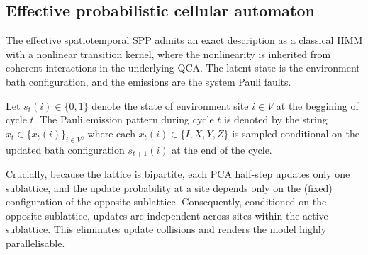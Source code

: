 \subsection{Effective probabilistic cellular automaton}\label{sec:pca-details}
The effective spatiotemporal SPP admits an exact description as a classical HMM with a nonlinear transition kernel, where the nonlinearity is inherited from coherent interactions in the underlying QCA. The latent state is the environment bath configuration, and the emissions are the system Pauli faults.

Let \(s_{t}(i) \in \{0,1\}\) denote the state of environment site \(i \in V\) at the beggining of cycle \(t\). The Pauli emission pattern during cycle \(t\) is denoted by the string \(x_t \in \{x_t(i)\}_{i \in V}\), where each \(x_t(i) \in \{I, X, Y, Z\}\) is sampled conditional on the updated bath configuration \(s_{t+1}(i)\) at the end of the cycle.

Crucially, because the lattice is bipartite, each PCA half-step updates only one sublattice, and the update probability at a site depends only on the (fixed) configuration of the opposite sublattice. Consequently, conditioned on the opposite sublattice, updates are independent across sites within the active sublattice. This eliminates update collisions and renders the model highly parallelisable.

